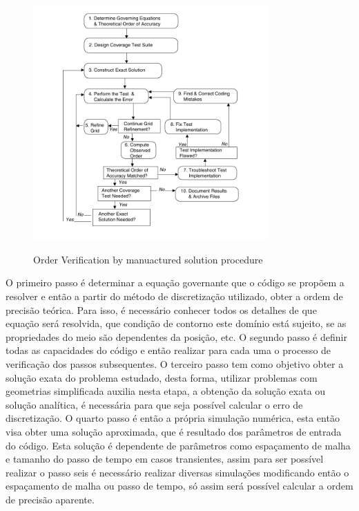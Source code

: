 \documentclass[
	12pt,				  %
	openright,		%
	twoside,			%
	a4paper,			%
	chapter=TITLE,		    %
	english,			%
	brazil				%
	]{abntex2}
\begin{document}
\begin{figure}[!htb]
\centering
\caption[Order Verification by manuactured solution procedure]{Order
    Verification by manuactured solution procedure}
\includegraphics[width=0.8\textwidth]{figures/ovmsp.pdf}
\label{fig-ovmsp}
\end{figure}

O primeiro passo é determinar a equação governante que o código se propõem a
resolver e então a partir do método de discretização utilizado, obter a ordem
de precisão teórica. Para isso, é necessário conhecer todos os detalhes de que
equação será resolvida, que condição de contorno este domínio está sujeito, se
as propriedades do meio são dependentes da posição, etc. O segundo passo é
definir todas as capacidades do código e então realizar para cada uma o
processo de verificação dos passos subsequentes. O terceiro passo tem como
objetivo obter a solução exata do problema estudado, desta forma, utilizar
problemas com geometrias simplificada auxilia nesta etapa, a obtenção da
solução exata ou solução analítica, é necessária para que seja possível
calcular o erro de discretização. O quarto passo é então a própria simulação
numérica, esta então visa obter uma solução aproximada, que é resultado dos
parâmetros de entrada do código. Esta solução é dependente de parâmetros como
espaçamento de malha e tamanho do passo de tempo em casos transientes, assim
para ser possível realizar o passo seis é necessário realizar diversas simulações
modificando então o espaçamento de malha ou passo de tempo, só assim será
possível calcular a ordem de precisão aparente.
\end{document}
